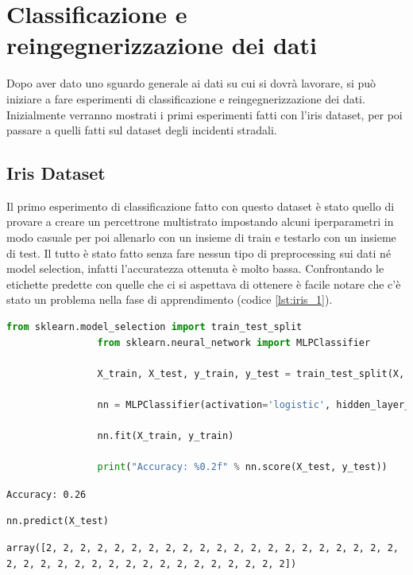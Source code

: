 \documentclass[12pt, twoside, letterpaper]{report}
\begin{document}
	\section{Classificazione e reingegnerizzazione dei dati} 
		Dopo aver dato uno sguardo generale ai dati su cui si dovrà lavorare, si può iniziare a fare esperimenti di classificazione e reingegnerizzazione dei dati. Inizialmente verranno mostrati i primi esperimenti fatti con l'iris dataset, per poi passare a quelli fatti sul dataset degli incidenti stradali. 
		
		\subsection{Iris Dataset}
			Il primo esperimento di classificazione fatto con questo dataset è stato quello di provare a creare un percettrone multistrato impostando alcuni iperparametri in modo casuale per poi allenarlo con un insieme di train e testarlo con un insieme di test. Il tutto è stato fatto senza fare nessun tipo di preprocessing sui dati né model selection, infatti l'accuratezza ottenuta è molto bassa. Confrontando le etichette predette con quelle che ci si aspettava di ottenere è facile notare che c'è stato un problema nella fase di apprendimento (codice \ref{lst:iris_1}). 

			\begin{lstlisting}[language=Python, caption=Primo esperimento con l'iris dataset, captionpos=t, gobble=8, label={lst:iris_1}]
				from sklearn.model_selection import train_test_split
				from sklearn.neural_network import MLPClassifier
				
				X_train, X_test, y_train, y_test = train_test_split(X, y)
				
				nn = MLPClassifier(activation='logistic', hidden_layer_sizes=(2), learning_rate_init=0.5, max_iter=500)
				
				nn.fit(X_train, y_train)
				
				print("Accuracy: %0.2f" % nn.score(X_test, y_test))
			\end{lstlisting}
			\texttt{Accuracy: 0.26}
			
			 
			\begin{lstlisting}[language=Python, gobble=8]
				nn.predict(X_test)
			\end{lstlisting}
			\texttt{array([2, 2, 2, 2, 2, 2, 2, 2, 2, 2, 2, 2, 2, 2, 2, 2, 2, 2, 2, 2, 2, 2, 2, 2, 2, 2, 2, 2, 2, 2, 2, 2, 2, 2, 2, 2, 2, 2])}
			
\end{document}

